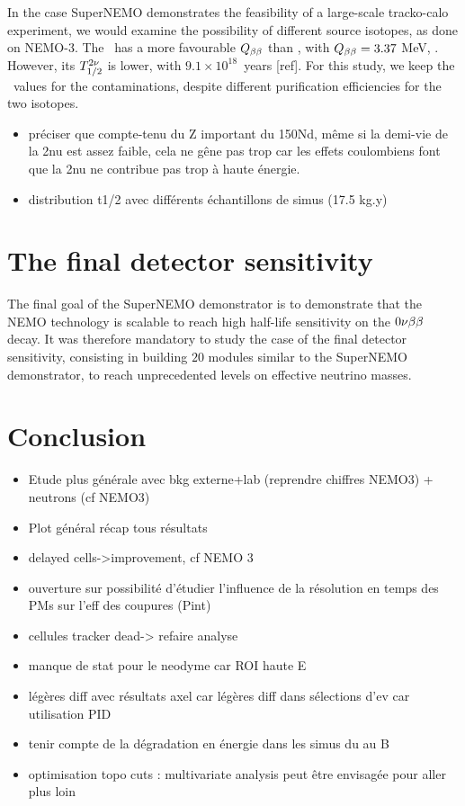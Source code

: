 In the case SuperNEMO demonstrates the feasibility of a large-scale tracko-calo experiment, we would examine the possibility of different source isotopes, as done on NEMO-$3$.
The \Nd\ has a more favourable $Q_{\beta\beta}$ than \Se, with $Q_{\beta\beta} = 3.37$ MeV, .
However, its $T_{1/2}^{2\nu}$ is lower, with $9.1\times 10^{18}$~years [ref].
For this study, we keep the \Se\ values for the contaminations, despite different purification efficiencies for the two isotopes.


\begin{itemize}
\item préciser que compte-tenu du Z important du 150Nd, même si la demi-vie de la 2nu est assez faible, cela ne gêne pas trop car les effets coulombiens font que la 2nu ne contribue pas trop à haute énergie.
\item distribution t1/2 avec différents échantillons de simus (17.5 kg.y)
\end{itemize}

\section{The final detector sensitivity}

The final goal of the SuperNEMO demonstrator is to demonstrate that the NEMO technology is scalable to reach high half-life sensitivity on the $0\nu\beta\beta$ decay.
It was therefore mandatory to study the case of the final detector sensitivity, consisting in building $20$ modules similar to the SuperNEMO demonstrator, to reach unprecedented levels on effective neutrino masses.



\section{Conclusion}
\begin{itemize}
\item Etude plus générale avec bkg externe+lab (reprendre chiffres NEMO3) + neutrons (cf NEMO3)
\item Plot général récap tous résultats
\item delayed cells->improvement, cf NEMO 3
\item ouverture sur possibilité d'étudier l'influence de la résolution en temps des PMs sur l'eff des coupures (Pint)
\item cellules tracker dead-> refaire analyse
\item manque de stat pour le neodyme car ROI haute E
\item légères diff avec résultats axel car légères diff dans sélections d'ev car utilisation PID
\item tenir compte de la dégradation en énergie dans les simus du au B
\item optimisation topo cuts : multivariate analysis peut être envisagée pour aller plus loin
\end{itemize}

